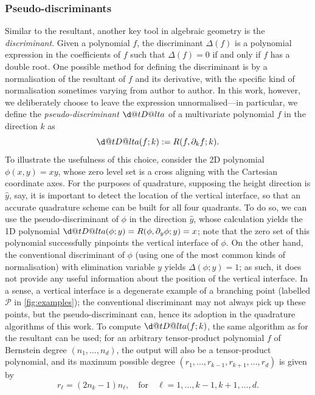 \documentclass[onefignum,onetabnum,onealgnum,oneeqnum]{siamart190516}
\makeatletter
\newcommand{\dotDelta}{{\vphantom{\Delta}\mathpalette\d@tD@lta\relax}}
\newcommand{\d@tD@lta}[2]{\ooalign{\hidewidth$\m@th#1\mkern-1mu\cdot$\hidewidth\cr$\m@th#1\Delta$\cr}}
\makeatother
\begin{document}
\subsubsection{Pseudo-discriminants}

Similar to the resultant, another key tool in algebraic geometry is the \textit{discriminant}. Given a polynomial $f$, the discriminant $\Delta(f)$ is a polynomial expression in the coefficients of $f$ such that $\Delta(f) = 0$ if and only if $f$ has a double root. One possible method for defining the discriminant is by a normalisation of the resultant of $f$ and its derivative, with the specific kind of normalisation sometimes varying from author to author. In this work, however, we deliberately choose to leave the expression unnormalised---in particular, we define the \textit{pseudo-discriminant} $\dotDelta$ of a multivariate polynomial $f$ in the direction $k$ as
\[ \dotDelta(f; k) := R(f, \partial_k f; k). \]
To illustrate the usefulness of this choice, consider the 2D polynomial $\phi(x,y) = xy$, whose zero level set is a cross aligning with the Cartesian coordinate axes. For the purposes of quadrature, supposing the height direction is $\hat y$, say, it is important to detect the location of the vertical interface, so that an accurate quadrature scheme can be built for all four quadrants. To do so, we can use the pseudo-discriminant of $\phi$ in the direction $\hat y$, whose calculation yields the 1D polynomial $\dotDelta(\phi; y) = R(\phi, \partial_y \phi; y) = x$; note that the zero set of this polynomial successfully pinpoints the vertical interface of $\phi$. On the other hand, the conventional discriminant of $\phi$ (using one of the most common kinds of normalisation) with elimination variable $y$ yields $\Delta(\phi; y) = 1$; as such, it does not provide any useful information about the position of the vertical interface. In a sense, a vertical interface is a degenerate example of a branching point (labelled ${\mathcal P}$ in \cref{fig:examples}); the conventional discriminant may not always pick up these points, but the pseudo-discriminant can, hence its adoption in the quadrature algorithms of this work. To compute $\dotDelta(f; k)$, the same algorithm as for the resultant can be used; for an arbitrary tensor-product polynomial $f$ of Bernstein degree $(n_1,\ldots,n_d)$, the output will also be a tensor-product polynomial, and its maximum possible degree $(r_1, \ldots, r_{k-1}, r_{k+1}, \ldots, r_d)$ is given by
\begin{equation} \label{eq:d} r_\ell = (2 n_k - 1) n_\ell, \quad \text{for} \quad \ell = 1, \ldots, k-1, k+1, \ldots, d. \end{equation}
\end{document}
